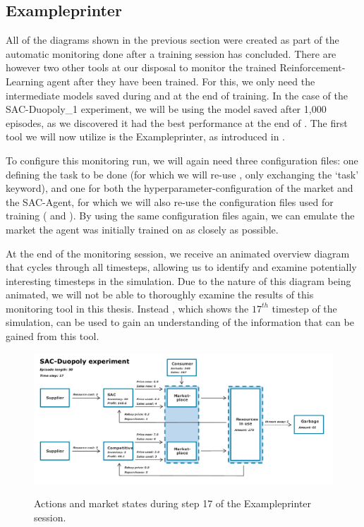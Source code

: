 \subsection*{Exampleprinter}

All of the diagrams shown in the previous section were created as part of the automatic monitoring done after a training session has concluded. There are however two other tools at our disposal to monitor the trained Reinforcement-Learning agent after they have been trained. For this, we only need the intermediate models saved during and at the end of training. In the case of the SAC-Duopoly\_1 experiment, we will be using the model saved after 1,000 episodes, as we discovered it had the best performance at the end of . The first tool we will now utilize is the Exampleprinter, as introduced in .

To configure this monitoring run, we will again need three configuration files: one defining the task to be done (for which we will re-use , only exchanging the `task' keyword), and one for both the hyperparameter-configuration of the market and the SAC-Agent, for which we will also re-use the configuration files used for training ( and ). By using the same configuration files again, we can emulate the market the agent was initially trained on as closely as possible.

At the end of the monitoring session, we receive an animated overview diagram that cycles through all timesteps, allowing us to identify and examine potentially interesting timesteps in the simulation. Due to the nature of this diagram being animated, we will not be able to thoroughly examine the results of this monitoring tool in this thesis. Instead , which shows the $17^{th}$ timestep of the simulation, can be used to gain an understanding of the information that can be gained from this tool.

\begin{figure}[t]
	\centering
	\includegraphics[width = \textwidth]{images/experiments/SACDuopoly/exampleprinter/ExampleprinterStep17.pdf}\\
	\caption{Actions and market states during step 17 of the Exampleprinter session.}\label{fig:SACDuopolyExampleprinter17}
\end{figure}

